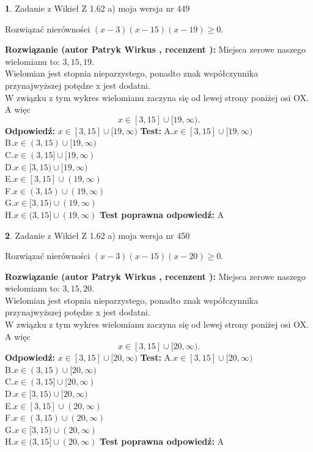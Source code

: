 \documentclass[12pt, a4paper]{article}
\theoremstyle{definition} %
\newtheorem{zad}{}
\newcommand{\zadStart}[1]{\begin{zad}#1\newline}
\newcommand{\zadStop}{\end{zad}}
\newcommand{\rozwStart}[2]{\noindent \textbf{Rozwiązanie (autor #1 , recenzent #2): }\newline}
\newcommand{\rozwStop}{\newline}
\newcommand{\odpStart}{\noindent \textbf{Odpowiedź:}\newline}
\newcommand{\odpStop}{\newline}
\newcommand{\testStart}{\noindent \textbf{Test:}\newline}
\newcommand{\testStop}{\newline}
\newcommand{\kluczStart}{\noindent \textbf{Test poprawna odpowiedź:}\newline}
\newcommand{\kluczStop}{\newline}
\begin{document}
\zadStart{Zadanie z Wikieł Z 1.62 a) moja wersja nr 449}

Rozwiązać nierówności $(x-3)(x-15)(x-19)\ge0$.
\zadStop
\rozwStart{Patryk Wirkus}{}
Miejsca zerowe naszego wielomianu to: $3, 15, 19$.\\
Wielomian jest stopnia nieparzystego, ponadto znak współczynnika przy\linebreak najwyższej potędze x jest dodatni.\\ W związku z tym wykres wielomianu zaczyna się od lewej strony poniżej osi OX. A więc $$x \in [3,15] \cup [19,\infty).$$
\rozwStop
\odpStart
$x \in [3,15] \cup [19,\infty)$
\odpStop
\testStart
A.$x \in [3,15] \cup [19,\infty)$\\
B.$x \in (3,15) \cup [19,\infty)$\\
C.$x \in (3,15] \cup [19,\infty)$\\
D.$x \in [3,15) \cup [19,\infty)$\\
E.$x \in [3,15] \cup (19,\infty)$\\
F.$x \in (3,15) \cup (19,\infty)$\\
G.$x \in [3,15) \cup (19,\infty)$\\
H.$x \in (3,15] \cup (19,\infty)$
\testStop
\kluczStart
A
\kluczStop



\zadStart{Zadanie z Wikieł Z 1.62 a) moja wersja nr 450}

Rozwiązać nierówności $(x-3)(x-15)(x-20)\ge0$.
\zadStop
\rozwStart{Patryk Wirkus}{}
Miejsca zerowe naszego wielomianu to: $3, 15, 20$.\\
Wielomian jest stopnia nieparzystego, ponadto znak współczynnika przy\linebreak najwyższej potędze x jest dodatni.\\ W związku z tym wykres wielomianu zaczyna się od lewej strony poniżej osi OX. A więc $$x \in [3,15] \cup [20,\infty).$$
\rozwStop
\odpStart
$x \in [3,15] \cup [20,\infty)$
\odpStop
\testStart
A.$x \in [3,15] \cup [20,\infty)$\\
B.$x \in (3,15) \cup [20,\infty)$\\
C.$x \in (3,15] \cup [20,\infty)$\\
D.$x \in [3,15) \cup [20,\infty)$\\
E.$x \in [3,15] \cup (20,\infty)$\\
F.$x \in (3,15) \cup (20,\infty)$\\
G.$x \in [3,15) \cup (20,\infty)$\\
H.$x \in (3,15] \cup (20,\infty)$
\testStop
\kluczStart
A
\kluczStop
\end{document}
